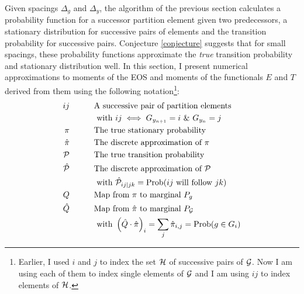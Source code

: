 \documentclass[]{article}
\newcommand\logx{y}
\newcommand\logf{g}
\newcommand\Logf{G}
\newcommand{\T}{{\cal P}}
\newcommand{\Td}{\hat \T} %
\DeclareMathOperator{\spaceop}{~~~~~~~~}
\begin{document}
Given spacings $\Delta_\logf$ and $\Delta_\logx$, the algorithm of the
previous section calculates a probability function for a successor
partition element given two predecessors, a stationary distribution
for successive pairs of elements and the transition probability for
successive pairs.  Conjecture \ref{conjecture} suggests that for small
spacings, these probability functions approximate the \emph{true}
transition probability and stationary distribution well.  In this
section, I present numerical approximations to moments of the EOS and
moments of the functionals $E$ and $T$ derived from them using the
following notation\footnote{Earlier, I used $i$ and $j$ to index the
  set ${\cal H}$ of successive pairs of ${\cal G}$.  Now I am using each of them
  to index single elements of ${\cal G}$ and I am using $ij$ to index
  elements of ${\cal H}$.}:
\begin{align*}
  ij &\spaceop  \text{A successive pair of partition elements} \\
  &\spaceop \text{ with }ij \iff \Logf_{y_{n+1}} = i ~\&~ \Logf_{y_n} = j \\
  \stationary &\spaceop \text{The true stationary probability} \\
  \Stationary &\spaceop \text{The discrete approximation of }
  \stationary \\
  \T &\spaceop  \text{The true transition probability} \\
  \Td &\spaceop \text{The discrete approximation of }\T \\
  &\spaceop \text{ with } \Td_{ij|jk} = \Prob(ij \text{ will follow } jk)\\
  Q &\spaceop \text{Map from } \stationary \text{ to marginal } P_\logf \\
  \Q &\spaceop \text{Map from } \Stationary \text{ to marginal } P_\SG \\
  &\spaceop \text{ with } \left(\Q \cdot \Stationary \right)_i = \sum_j
  \Stationary_{i,j} = \Prob(\logf \in \Logf_i)
\end{align*}
\end{document}

